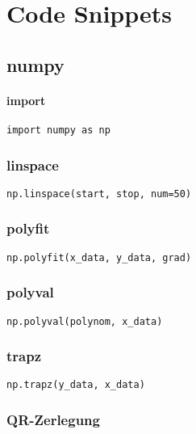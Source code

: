 \section{Code Snippets}

\subsection{numpy}

\paragraph{import}

\begin{verbatim}
import numpy as np
\end{verbatim}

\subsubsection{linspace}

\begin{verbatim}
np.linspace(start, stop, num=50)
\end{verbatim}

\subsubsection{polyfit}

\begin{verbatim}
np.polyfit(x_data, y_data, grad)
\end{verbatim}

\subsubsection{polyval}

\begin{verbatim}
np.polyval(polynom, x_data)
\end{verbatim}

\subsubsection{trapz}

\begin{verbatim}
np.trapz(y_data, x_data)
\end{verbatim}

\subsubsection{QR-Zerlegung}

